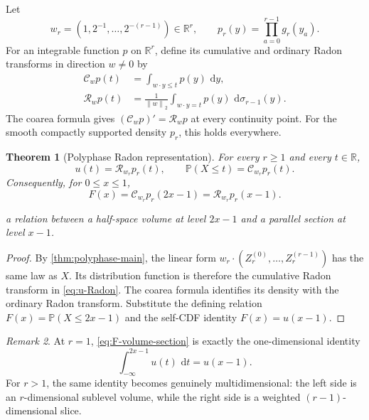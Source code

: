 \documentclass[11pt,oneside]{article}
\numberwithin{equation}{section}
\newtheorem{theorem}{Theorem}[section]
\theoremstyle{definition}
\theoremstyle{remark}
\newtheorem{remark}[theorem]{Remark}
\newcommand{\R}{\mathbb R}
\newcommand{\Prob}{\mathbb P}
\newcommand{\dd}{\,\mathrm d}
\newcommand{\norm}[1]{\left\lVert#1\right\rVert}
\newcommand{\cC}{\mathcal C}
\newcommand{\cR}{\mathcal R}
\begin{document}
Let
\begin{equation}
 w_r=(1,2^{-1},\ldots,2^{-(r-1)})\in\R^r,
 \qquad
 p_r(y)=\prod_{a=0}^{r-1}g_r(y_a).                         \label{eq:wr-pr}
\end{equation}
For an integrable function $p$ on $\R^r$, define its cumulative and ordinary
Radon transforms in direction $w\ne0$ by
\begin{align}
 \cC_wp(t)&=\int_{w\cdot y\le t}p(y)\,\dd y,              \label{eq:cumulative-Radon}\\
 \cR_wp(t)&=\frac1{\norm w_2}
   \int_{w\cdot y=t}p(y)\,\dd\sigma_{r-1}(y).             \label{eq:Radon-def}
\end{align}
The coarea formula gives $(\cC_wp)'=\cR_wp$ at every continuity point.
For the smooth compactly supported density $p_r$, this holds everywhere.

\begin{theorem}[Polyphase Radon representation]
\label{thm:Radon-representation}
For every $r\ge1$ and every $t\in\R$,
\begin{equation}
 \boxed{\displaystyle
 u(t)=\cR_{w_r}p_r(t),
 \qquad
 \Prob(X\le t)=\cC_{w_r}p_r(t).}                          \label{eq:u-Radon}
\end{equation}
Consequently, for $0\le x\le1$,
\begin{equation}
 \boxed{\displaystyle
 F(x)=\cC_{w_r}p_r(2x-1)=\cR_{w_r}p_r(x-1).}              \label{eq:F-volume-section}
\end{equation}

a relation between a half-space volume at level $2x-1$ and a parallel section
at level $x-1$.
\end{theorem}

\begin{proof}
By \cref{thm:polyphase-main}, the linear form
$w_r\cdot(Z_r^{(0)},\ldots,Z_r^{(r-1)})$ has the same law as $X$.
Its distribution function is therefore the cumulative Radon transform in
\eqref{eq:u-Radon}.  The coarea formula identifies its density with the
ordinary Radon transform.  Substitute the defining relation
$F(x)=\Prob(X\le2x-1)$ and the self-CDF identity $F(x)=u(x-1)$.
\end{proof}

\begin{remark}
At $r=1$, \eqref{eq:F-volume-section} is exactly the one-dimensional identity
\[
 \int_{-\infty}^{2x-1}u(t)\,\dd t=u(x-1).
\]
For $r>1$, the same identity becomes genuinely multidimensional: the left side
is an $r$-dimensional sublevel volume, while the right side is a weighted
$(r-1)$-dimensional slice.
\end{remark}
\end{document}
